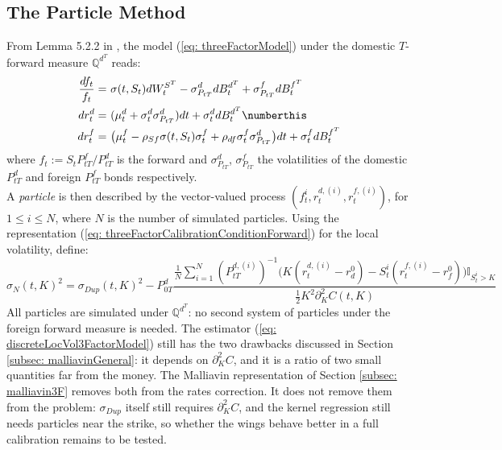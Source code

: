 \subsection{The Particle Method}
From Lemma 5.2.2 in \cite{hybridModel}, the model (\ref{eq: threeFactorModel}) under the domestic $T$-forward measure $\mathbb{Q}^{d^T}$ reads:
\begin{align*}
 \frac{df_t}{f_t}   = &\ \sigma(t,S_t)dW^{S^T}_t - \sigma_{P_{tT}}^d dB_t^{d^T} + \sigma_{P_{tT}}^f dB_t^{f^T} \\
 dr_t^d  = &\  (\mu^d_t + \sigma_t^d\sigma_{P_{tT}}^d)dt + \sigma_t^d dB_t^{d^T} \numberthis \label{eq: threeFactorModelForward}\\
 dr_t^f  = & \ \big(\mu^f_t - \rho_{Sf}\sigma(t,S_t)\sigma_t^f +\rho_{df}\sigma_t^f\sigma_{P_{tT}}^d \big)dt + \sigma_t^f dB_t^{f^T}
\end{align*}
where $f_t:=S_t P^f_{tT}/P^d_{tT}$ is the forward and $\sigma_{P_{tT}}^d$, $\sigma_{P_{tT}}^f$ the volatilities of the domestic $P^d_{tT}$ and foreign $P^f_{tT}$ bonds respectively.\\
A \textit{particle} is then described by the vector-valued process $(f_t^i,r_t^{d,(i)},r_t^{f,(i)})$, for $1\leq i \leq N$, where $N$ is the number of simulated particles. Using the representation (\ref{eq: threeFactorCalibrationConditionForward}) for the local volatility, define:
\begin{equation}\label{eq: discreteLocVol3FactorModel}
\sigma_N(t,K)^2  =  \sigma_{Dup}(t,K)^2  - P^d_{0T}\frac{\frac{1}{N}\sum_{i=1}^N (P_{tT}^{d,(i)})^{-1}\big(K(r_t^{d,(i)}-r^0_d)-S^i_t(r_t^{f,(i)}-r^0_f)\big)\mathbb{I}_{S_t^i>K} }{\frac{1}{2}K^2\partial^2_KC(t,K)}
\end{equation}
All particles are simulated under $\mathbb{Q}^{d^T}$: no second system of particles under the foreign forward measure is needed. The estimator (\ref{eq: discreteLocVol3FactorModel}) still has the two drawbacks discussed in Section \ref{subsec: malliavinGeneral}: it depends on $\partial_K^2C$, and it is a ratio of two small quantities far from the money. The Malliavin representation of Section \ref{subsec: malliavin3F} removes both from the rates correction. It does not remove them from the problem: $\sigma_{Dup}$ itself still requires $\partial_K^2C$, and the kernel regression still needs particles near the strike, so whether the wings behave better in a full calibration remains to be tested.

